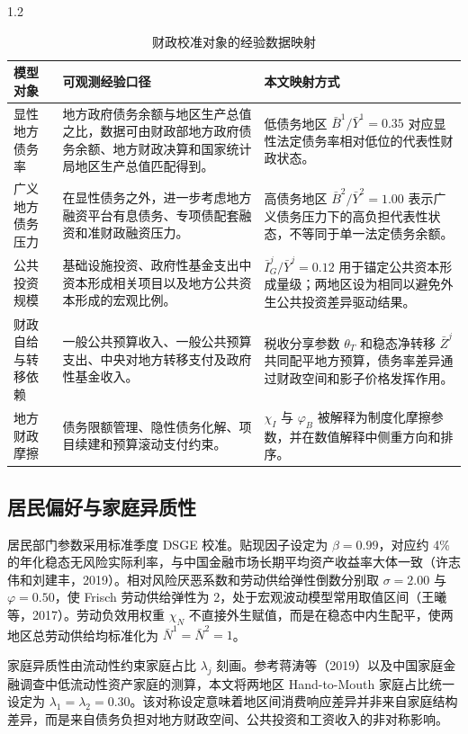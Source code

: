 \documentclass[12pt,UTF8]{ctexart}
\begin{document}
\begin{spacing}{1.2}
		\begin{table}[H]
			\centering
			\caption{财政校准对象的经验数据映射}
			\label{tab:empirical_anchor}
			\small
			\begin{tabular}{p{}p{0.34\textwidth}p{}}
				\toprule
				\textbf{模型对象} & \textbf{可观测经验口径} & \textbf{本文映射方式} \\
				\midrule
				显性地方债务率 & 地方政府债务余额与地区生产总值之比，数据可由财政部地方政府债务余额、地方财政决算和国家统计局地区生产总值匹配得到。 & 低债务地区 $\bar B^1/\bar Y^1=0.35$ 对应显性法定债务率相对低位的代表性财政状态。 \\
				广义地方债务压力 & 在显性债务之外，进一步考虑地方融资平台有息债务、专项债配套融资和准财政融资压力。 & 高债务地区 $\bar B^2/\bar Y^2=1.00$ 表示广义债务压力下的高负担代表性状态，不等同于单一法定债务余额。 \\
				公共投资规模 & 基础设施投资、政府性基金支出中资本形成相关项目以及地方公共资本形成的宏观比例。 & $\bar I_G^j/\bar Y^j=0.12$ 用于锚定公共资本形成量级；两地区设为相同以避免外生公共投资差异驱动结果。 \\
				财政自给与转移依赖 & 一般公共预算收入、一般公共预算支出、中央对地方转移支付及政府性基金收入。 & 税收分享参数 $\theta_T$ 和稳态净转移 $\bar Z^j$ 共同配平地方预算，债务率差异通过财政空间和影子价格发挥作用。 \\
				地方财政摩擦 & 债务限额管理、隐性债务化解、项目续建和预算滚动支付约束。 & $\chi_I$ 与 $\varphi_B$ 被解释为制度化摩擦参数，并在数值解释中侧重方向和排序。 \\
				\bottomrule
			\end{tabular}
		\end{table}
		
		\subsection{居民偏好与家庭异质性}
		
		居民部门参数采用标准季度 DSGE 校准。贴现因子设定为 $\beta=0.99$，对应约 4\% 的年化稳态无风险实际利率，与中国金融市场长期平均资产收益率大体一致（许志伟和刘建丰，2019）。相对风险厌恶系数和劳动供给弹性倒数分别取 $\sigma=2.00$ 与 $\varphi=0.50$，使 Frisch 劳动供给弹性为 2，处于宏观波动模型常用取值区间（王曦等，2017）。劳动负效用权重 $\chi_N$ 不直接外生赋值，而是在稳态中内生配平，使两地区总劳动供给均标准化为 $\bar N^1=\bar N^2=1$。
		
		家庭异质性由流动性约束家庭占比 $\lambda_j$ 刻画。参考蒋涛等（2019）以及中国家庭金融调查中低流动性资产家庭的测算，本文将两地区 Hand-to-Mouth 家庭占比统一设定为 $\lambda_1=\lambda_2=0.30$。该对称设定意味着地区间消费响应差异并非来自家庭结构差异，而是来自债务负担对地方财政空间、公共投资和工资收入的非对称影响。
		

\end{spacing}
\end{document}
